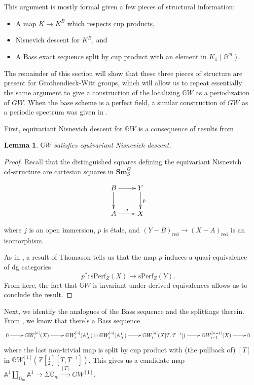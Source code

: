 \documentclass[edeposit,fullpage]{uiucthesis2009}
\newcommand{\Z}{\mathbb Z}
\newcommand{\mbb}{\mathbb}
\newcommand{\Sm}[1]{\mathbf{Sm}_{#1}}
\theoremstyle{plain}
\newtheorem{lemma}{Lemma}
\numberwithin{lemma}{section}
\theoremstyle{definition}
\begin{document}
This argument is mostly formal given a few pieces of structural
information:
\begin{itemize}
\item A map $K \rightarrow K^B$ which respects cup
  products,
\item Nisnevich descent for $K^B$, and
\item A Bass exact sequence split by cup product with an element in
  $K_1(\mbb G^m)$.
\end{itemize}

The remainder of this section will show that these three pieces of
structure are present
for Grothendieck-Witt groups, which will allow us to repeat
essentially the same argument to give a construction of the localizing
$\mbb GW$ as a periodization of $GW$. When the base scheme is a
perfect field, a similar construction
of $GW$ as a periodic spectrum was given in \cite{HuKriz}.


First, equivariant Nisnevich
descent for $\mbb GW$ is a consequence of results from \cite{Schder}.

\begin{lemma}
$\mbb GW$ satisfies equivariant Nisnevich descent. 
\end{lemma}

\begin{proof}
Recall that the distinguished squares defining the equivariant
Nisnevich cd-structure are cartesian squares in $\Sm{S}^G$ 

\[
\xymatrix{B \ar[r]\ar[d] & Y \ar[d]^p \\ A \ar[r]^j & X}
\]

where $j$ is an open immersion, $p$ is \'etale, and
$(Y-B)_{\mathrm{red}} \rightarrow (X-A)_{\mathrm{red}}$ is an
isomorphism. 

As in \cite[Theorem 9.6]{Schder}, a result of Thomason \cite[Theorem 2.6.3]{Thomason2007} tells us that the map $p$
induces a quasi-equivalence of dg categories
\[
p^* : \mathrm{sPerf}_Z(X) \rightarrow \mathrm{sPerf}_Z(Y).
\]
From here, the fact that $\mbb GW$ is invariant under derived
equivalences \cite[Theorem 8.9]{Schder} allows us to conclude the result. 
\end{proof}

 Next, we
identify the analogues of the Bass sequence and the splittings
therein. From \cite[Theorem 9.13]{Schder}, we know that there's a Bass sequence
\[
\xymatrix{0 \ar[r] & \mbb GW^{[n]}_i(X) \ar[r] & \mbb GW^{[n]}_i(\mbb
  A^1_X) \oplus \mbb GW^{[n]}_i(\mbb A^1_X) \ar[r] & \mbb
  GW^{[n]}_i(X[T,T^{-1}]) \ar[r] & \mbb GW^{[n-1]}_{i-1}(X) \ar[r] & 0}
\]
where the last non-trivial map is split by cup product with (the
pullback of) $[T]$ in $\mbb
GW_1^{[1]}(\Z[\frac{1}{2}][T,T^{-1}])$. This gives us a candidate map
$\mbb A^1 \coprod_{\mbb G_m} \mbb A^1 \rightarrow \Sigma \mbb G_m \xrightarrow{[T]} GW^{[1]}$. 
\end{document}
